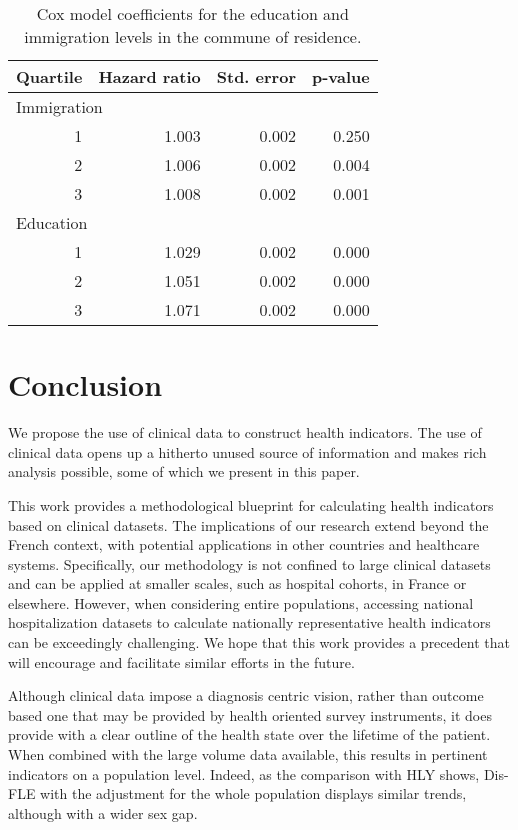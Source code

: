 \documentclass{article}
\begin{document}
\begin{longtable}{rrrr}
\caption{
\label{tab:cox-f3-coefs-immi-dip}Cox model coefficients for the education and immigration levels in the commune of residence.
} \\ 
\toprule
Quartile & Hazard ratio & Std. error & p-value \\ 
\midrule
\multicolumn{4}{l}{Immigration} \\ 
\midrule
1 & 1.003 & 0.002 & 0.250 \\ 
2 & 1.006 & 0.002 & 0.004 \\ 
3 & 1.008 & 0.002 & 0.001 \\ 
\midrule
\multicolumn{4}{l}{Education} \\ 
\midrule
1 & 1.029 & 0.002 & 0.000 \\ 
2 & 1.051 & 0.002 & 0.000 \\ 
3 & 1.071 & 0.002 & 0.000 \\ 
\bottomrule
\end{longtable}

\hypertarget{conclusion}{%
\section{\texorpdfstring{Conclusion
\label{sec:discuss}}{Conclusion }}\label{conclusion}}

We propose the use of clinical data to construct health indicators. The
use of clinical data opens up a hitherto unused source of information
and makes rich analysis possible, some of which we present in this
paper.

This work provides a methodological blueprint for calculating health
indicators based on clinical datasets. The implications of our research
extend beyond the French context, with potential applications in other
countries and healthcare systems. Specifically, our methodology is not
confined to large clinical datasets and can be applied at smaller
scales, such as hospital cohorts, in France or elsewhere. However, when
considering entire populations, accessing national hospitalization
datasets to calculate nationally representative health indicators can be
exceedingly challenging. We hope that this work provides a precedent
that will encourage and facilitate similar efforts in the future.

Although clinical data impose a diagnosis centric vision, rather than
outcome based one that may be provided by health oriented survey
instruments, it does provide with a clear outline of the health state
over the lifetime of the patient. When combined with the large volume
data available, this results in pertinent indicators on a population
level. Indeed, as the comparison with HLY shows, Dis-FLE with the
adjustment for the whole population displays similar trends, although
with a wider sex gap.
\end{document}
